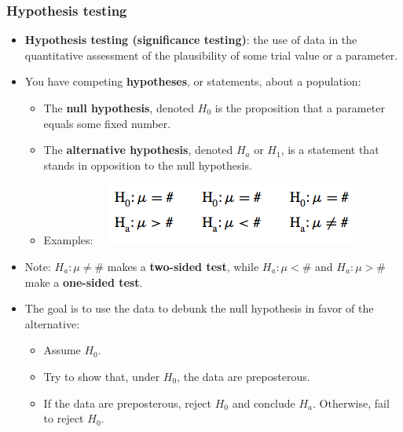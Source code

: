 \documentclass[handout]{beamer}\usepackage{graphicx, color}
\providecommand{\q}{$\quad$ \newline}
\numberwithin{equation}{section}
\begin{document}
\begin{frame}
\frametitle{Hypothesis testing} \scriptsize
\begin{itemize}
\item {\bf Hypothesis testing (significance testing)}: the use of data in the quantitative assessment of the plausibility of some trial value or a parameter. 
\pause \item You have competing {\bf hypotheses}, or statements, about a population:
\begin{itemize}
\pause \item The {\bf null hypothesis}, denoted $H_0$ is the proposition that a parameter equals some fixed number.
\pause \item The {\bf alternative hypothesis}, denoted $H_a$ or $H_1$, is a statement that stands in opposition to the null hypothesis.
\pause \item Examples:\q
{} \includegraphics{../../fig/examplehypotheses.png}
\end{itemize}
\pause \item Note: $H_a: \mu \ne \#$ makes a {\bf two-sided test}, while $H_a: \mu < \#$ and $H_a: \mu > \#$ make a {\bf one-sided test}.
\pause \item The goal is to use the data to debunk the null hypothesis in favor of the alternative:
\begin{itemize}
\pause \item Assume $H_0$.
\pause \item Try to show that, under $H_0$, the data are preposterous.
\pause \item If the data are preposterous, reject $H_0$ and conclude $H_a$. Otherwise, fail to reject $H_0$.
\end{itemize}
\end{itemize}
\end{frame}
\end{document}
